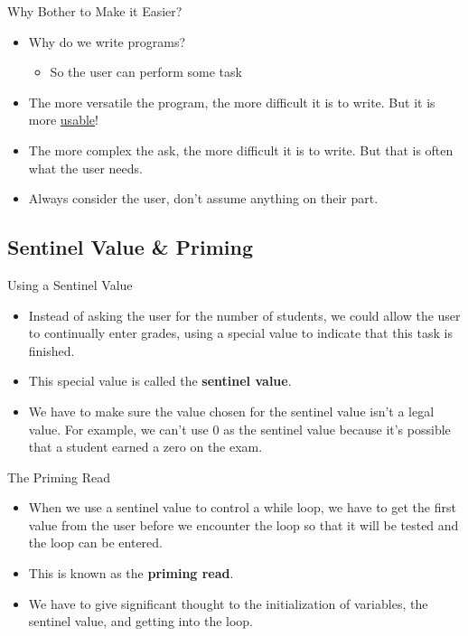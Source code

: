 \documentclass[graphics]{beamer}
\begin{document}
\begin{frame}{Why Bother to Make it Easier?}
    \begin{itemize}
        \item Why do we write programs?
        \begin{itemize}
            \item So the user can perform some task
        \end{itemize}
        \item The more versatile the program, the more difficult it is to write. But it is more \underline{usable}!
        \item The more complex the ask, the more difficult it is to write. But that is often what the user needs.
        \item Always consider the user, don't assume anything on their part.
    \end{itemize}
\end{frame}

\subsection*{Sentinel Value \& Priming}
\begin{frame}{Using a Sentinel Value}
    \begin{itemize}
        \item Instead of asking the user for the number of students, we could allow the user to continually enter grades, using a special value to indicate that this task is finished.
        \item This special value is called the \textbf{sentinel value}.
        \item We have to make sure the value chosen for the sentinel value isn't a legal value. For example, we can't use 0 as the sentinel value because it's possible that a student earned a zero on the exam.
    \end{itemize}
\end{frame}

\begin{frame}{The Priming Read}
    \begin{itemize}
        \item When we use a sentinel value to control a while loop, we have to get the first value from the user before we encounter the loop so that it will be tested and the loop can be entered.
        \item This is known as the \textbf{priming read}.
        \item We have to give significant thought to the initialization of variables, the sentinel value, and getting into the loop.
    \end{itemize}
\end{frame}
\end{document}
